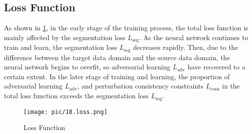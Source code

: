 \subsection{Loss Function}

As shown in \cref{fig:loss}, in the early stage of the training process, 
the total loss function is mainly affected by the segmentation loss $L_{\text{seg}}$. 
As the neural network continues to train and learn, the segmentation loss $L_{\text{seg}}$ decreases rapidly. 
Then, due to the difference between the target data domain and the source data domain, the neural network begins to overfit, 
so adversarial learning $L_{\text{adv}}$ have recovered to a certain extent. 
In the later stage of training and learning, the proportion of adversarial learning $L_{\text{adv}}$, 
and perturbation consistency constraints $L_{\text{cons}}$ in the total loss function exceeds the segmentation loss $L_{\text{seg}}$.

\begin{figure}[htbp]
    \centering
    \texttt{[image: pic/18.loss.png]}
    \caption{Loss Function}
    \label{fig:loss}
\end{figure}

